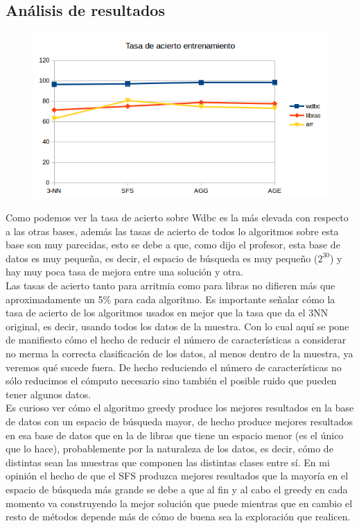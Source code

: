 \documentclass[10pt,a4paper]{article}
\begin{document}
\subsection{\color[rgb]{0.0,0.0,0.51}Análisis de resultados}


\begin{figure}[H]
\centering
\includegraphics[width=130mm]{tasa_train_ag.png}
\end{figure}

Como podemos ver la tasa de acierto sobre Wdbc es la más elevada con respecto a las otras bases, además las tasas de acierto de todos lo algoritmos sobre esta base son muy parecidas, esto se debe a que, como dijo el profesor, esta base de datos es muy pequeña, es decir, el espacio de búsqueda es muy pequeño ($2^{30}$) y hay muy poca tasa de mejora entre una solución y otra.\\

Las tasas de acierto tanto para arritmia como para libras no difieren más que aproximadamente un 5\% para cada algoritmo. Es importante señalar cómo la tasa de acierto de los algoritmos usados en mejor que la tasa que da el 3NN original, es decir, usando todos los datos de la muestra. Con lo cual aquí se pone de manifiesto cómo el hecho de reducir el número de características a considerar no merma la correcta clasificación de los datos, al menos dentro de la muestra, ya veremos qué sucede fuera. De hecho reduciendo el número de características no sólo reducimos el cómputo necesario sino también el posible ruido que pueden tener algunos datos.\\

Es curioso ver cómo el algoritmo greedy produce los mejores resultados en la base de datos con un espacio de búsqueda mayor, de hecho produce mejores resultados en esa base de datos que en la de libras que tiene un espacio menor (es el único que lo hace), probablemente por la naturaleza de los datos, es decir, cómo de distintas sean las muestras que componen las distintas clases entre sí. En mi opinión el hecho de que el SFS produzca mejores resultados que la mayoría en el espacio de búsqueda más grande se debe a que al fin y al cabo el greedy en cada momento va construyendo la mejor solución que puede mientras que en cambio el resto de métodos depende más de cómo de buena sea la exploración que realicen.\\
\end{document}
